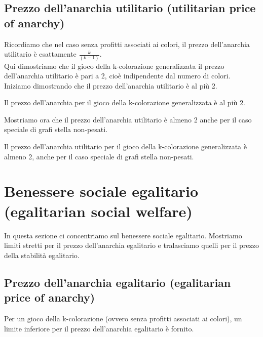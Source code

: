 \subsection{Prezzo dell'anarchia utilitario (utilitarian price of anarchy)}
\justify
Ricordiamo che nel caso senza profitti associati ai colori, il prezzo dell'anarchia utilitario è esattamente \(\frac{k}{(k-1)}\).\\

Qui dimostriamo che il gioco della k-colorazione generalizzata il prezzo dell'anarchia utilitario è pari a 2, cioè indipendente dal numero di colori.\\

Iniziamo dimostrando che il prezzo dell'anarchia utilitario è al più 2.\\

\begin{theorem}
\label{theorem1}
	Il prezzo dell'anarchia per il gioco della k-colorazione generalizzata è al più 2. 
\end{theorem}

Mostriamo ora che il prezzo dell'anarchia utilitario è almeno 2 anche per il caso speciale di grafi stella non-pesati.\\

\begin{theorem}
\label{theorem2}
	Il prezzo dell'anarchia utilitario per il gioco della k-colorazione generalizzata è almeno 2, anche per il caso speciale di grafi stella non-pesati.
\end{theorem}

\section{Benessere sociale egalitario (egalitarian social welfare)}
\justify
In questa sezione ci concentriamo sul benessere sociale egalitario. Mostriamo limiti stretti per il prezzo dell'anarchia egalitario e tralasciamo quelli per il prezzo della stabilità egalitario.\\

\subsection{Prezzo dell'anarchia egalitario (egalitarian price of anarchy)}
\justify
Per un gioco della k-colorazione (ovvero senza profitti associati ai colori), un limite inferiore per il prezzo dell'anarchia egalitario è fornito.\\

